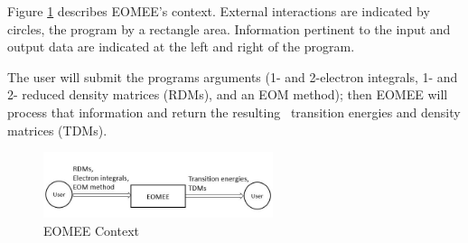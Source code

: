 \documentclass[12pt]{article}
\begin{document}

Figure \ref{Fig_SystemContext} describes EOMEE's context. 
External interactions are indicated by circles, the program by a rectangle 
area. Information pertinent to the input and output data are indicated at the 
left and right of the program.

\noindent The user will submit the programs arguments (1- and 2-electron 
integrals, 1- and 2- reduced density matrices (RDMs), and an EOM 
method); then EOMEE will process that information and return the resulting 
transition energies and density matrices (TDMs). 

\begin{figure}[h!]
	\begin{center}
		\includegraphics[width=0.6\textwidth]{systemcontext}
		\caption{EOMEE Context}
		\label{Fig_SystemContext} 
	\end{center}
\end{figure}

\end{document}
